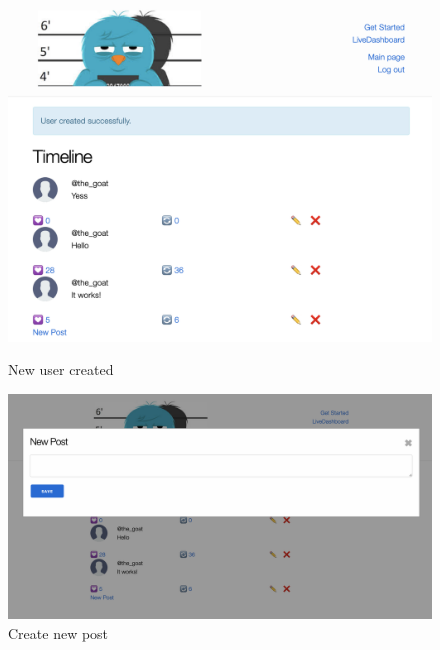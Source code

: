 \begin{figure}[htbp]
	\centering
	
	\begin{minipage}[b]{0.45\textwidth}
		\centering
		\includegraphics[width=\linewidth]{figures/created_user.png}
		\caption{New user created}
		\label{fig:user}
	\end{minipage}
	\hfill
	\begin{minipage}[b]{0.45\textwidth}
		\centering
		\includegraphics[width=\linewidth]{figures/new_post.png}
		\caption{Create new post}
		\label{fig:np}
	\end{minipage}

\end{figure}


